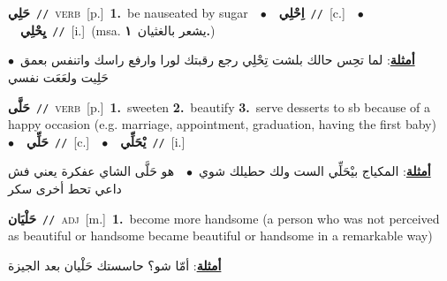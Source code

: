 \documentclass[10pt,a4paper,twoside]{article} %
\begin{document}
\begin{multicols}{2}
{\setlength\topsep{0pt}\textbf{\foreignlanguage{arabic}{حَلِي}}\ {\color{gray}\texttt{//}\color{black}}\ \textsc{verb}\ [p.]\ \textbf{1.}~be nauseated by sugar\ \ $\bullet$\ \ \setlength\topsep{0pt}\textbf{\foreignlanguage{arabic}{اِحْلِي}}\ {\color{gray}\texttt{//}\color{black}}\ [c.]\ \ $\bullet$\ \ \setlength\topsep{0pt}\textbf{\foreignlanguage{arabic}{يِحْلِي}}\ {\color{gray}\texttt{//}\color{black}}\ [i.]\ \color{gray}(msa. \foreignlanguage{arabic}{يشعر بالغثيان}~\foreignlanguage{arabic}{\textbf{١.}})\color{black}\  \begin{flushright}\color{gray}\foreignlanguage{arabic}{\textbf{\underline{\foreignlanguage{arabic}{أمثلة}}}: لما تحِس حالك بلشت تِحْلِي رجع رقبتك لورا وارفع راسك واتنفس بعمق\ $\bullet$\ \  حَلِيت ولعَعَت نفسي}\end{flushright}\color{black}} \vspace{2mm}

{\setlength\topsep{0pt}\textbf{\foreignlanguage{arabic}{حَلَّى}}\ {\color{gray}\texttt{//}\color{black}}\ \textsc{verb}\ [p.]\ \textbf{1.}~sweeten  \textbf{2.}~beautify  \textbf{3.}~serve desserts to sb because of a happy occasion (e.g. marriage, appointment, graduation, having the first baby)\ \ $\bullet$\ \ \setlength\topsep{0pt}\textbf{\foreignlanguage{arabic}{حَلِّي}}\ {\color{gray}\texttt{//}\color{black}}\ [c.]\ \ $\bullet$\ \ \setlength\topsep{0pt}\textbf{\foreignlanguage{arabic}{يْحَلِّي}}\ {\color{gray}\texttt{//}\color{black}}\ [i.]\  \begin{flushright}\color{gray}\foreignlanguage{arabic}{\textbf{\underline{\foreignlanguage{arabic}{أمثلة}}}: المكياج بيْحَلِّي الست ولك حطيلك شوي\ $\bullet$\ \  هو حَلَّى الشاي عفكرة يعني فش داعي تحط أخرى سكر}\end{flushright}\color{black}} \vspace{2mm}

{\setlength\topsep{0pt}\textbf{\foreignlanguage{arabic}{حَلْيَان}}\ {\color{gray}\texttt{//}\color{black}}\ \textsc{adj}\ [m.]\ \textbf{1.}~become more handsome (a person who was not perceived as beautiful or handsome became beautiful or handsome in a remarkable way)\  \begin{flushright}\color{gray}\foreignlanguage{arabic}{\textbf{\underline{\foreignlanguage{arabic}{أمثلة}}}: أمّا شو؟ حاسستك حَلْيان بعد الجيزة}\end{flushright}\color{black}} \vspace{2mm}


\end{multicols}
\end{document}
